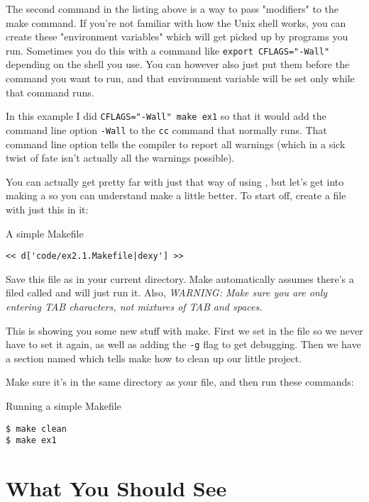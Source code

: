 The second command in the listing above is a way to pass "modifiers" to the
make command.  If you're not familiar with how the Unix shell works, you can
create these "environment variables" which will get picked up by programs you
run.  Sometimes you do this with a command like \verb|export CFLAGS="-Wall"|
depending on the shell you use.  You can however also just put them before the
command you want to run, and that environment variable will be set only while
that command runs.

In this example I did \verb|CFLAGS="-Wall" make ex1| so that it would
add the command line option \verb|-Wall| to the \verb|cc| command that
 normally runs.  That command line option tells the compiler
 to report all warnings (which in a sick twist of fate isn't
actually all the warnings possible).

You can actually get pretty far with just that way of using ,
but let's get into making a  so you can understand
make a little better.  To start off, create a file with just this
in it:

\begin{code}{A simple Makefile}
\begin{lstlisting}
<< d['code/ex2.1.Makefile|dexy'] >>
\end{lstlisting}
\end{code}

Save this file as  in your current directory.  Make
automatically assumes there's a filed called  and will
just run it.  Also, \emph{WARNING: Make sure you are only entering TAB
characters, not mixtures of TAB and spaces.}

This  is showing you some new stuff with make.  First we set
 in the file so we never have to set it again, as well
as adding the \verb|-g| flag to get debugging.  Then we have a 
section named  which tells make how to clean up our
little project.

Make sure it's in the same directory as your  file, and then
run these commands:

\begin{Terminal}{Running a simple Makefile}
\begin{lstlisting}
$ make clean
$ make ex1
\end{lstlisting}
\end{Terminal}

\section{What You Should See}

